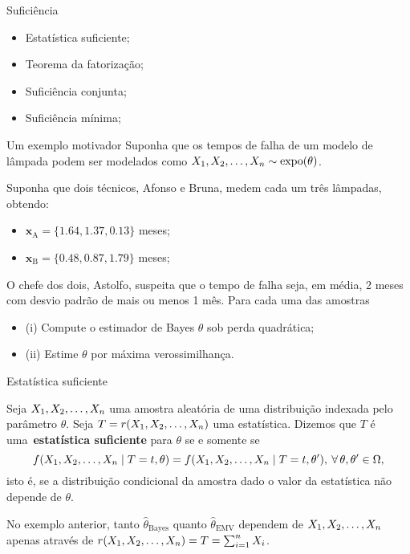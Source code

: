 \begin{frame}{Suficiência}
 \begin{itemize}
  \item Estatística suficiente;
  \item Teorema da fatorização;
    \item Suficiência conjunta;
  \item Suficiência mínima;
 \end{itemize}
\end{frame}

\begin{frame}{Um exemplo motivador}
Suponha que os tempos de falha de um modelo de lâmpada podem ser modelados como $X_1, X_2, \ldots, X_n \sim \operatorname{expo}(\theta)$.

Suponha que dois técnicos, Afonso e Bruna, medem cada um três lâmpadas, obtendo:
\begin{itemize}
 \item $\boldsymbol{x}_{\text{A}} = \{1.64, 1.37, 0.13\}$ meses;
 \item $\boldsymbol{x}_{\text{B}} = \{0.48, 0.87, 1.79\}$ meses;
\end{itemize}

O chefe dos dois, Astolfo, suspeita que o tempo de falha seja, em média, 2 meses com desvio padrão de mais ou menos 1 mês.
Para cada uma das amostras
\begin{itemize}
 \item (i) Compute o estimador de Bayes $\theta$ sob perda quadrática; 
 \item (ii) Estime $\theta$ por máxima verossimilhança.
\end{itemize}
\end{frame}

\begin{frame}{Estatística suficiente}
\begin{defn}
 \label{def:sufficient_statistic}
 Seja $X_1, X_2, \ldots, X_n$ uma amostra aleatória de uma distribuição indexada pelo parâmetro $\theta$.
 Seja $T = r(X_1, X_2, \ldots, X_n)$ uma estatística.
 Dizemos que $T$ é uma~\textbf{estatística suficiente} para $\theta$ se e somente se
 \[ f(X_1, X_2, \ldots, X_n \mid T = t, \theta) = f(X_1, X_2, \ldots, X_n \mid T = t, \theta^\prime),\: \forall\, \theta, \theta^\prime \in \Omega, \]
 isto é, se a distribuição condicional da amostra dado o valor da estatística não depende de $\theta$.
\end{defn}

No exemplo anterior, tanto $\hat{\theta}_{\text{Bayes}}$ quanto $\hat{\theta}_{\text{EMV}}$ dependem de $X_1, X_2, \ldots, X_n$ apenas através de $r(X_1, X_2, \ldots, X_n) = T = \sum_{i=1}^n X_i$.
\end{frame}

